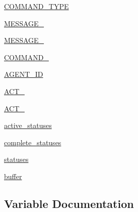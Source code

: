 \begin{DoxyCompactItemize}
\item 
\hyperlink{namespaceparlai_1_1mturk_1_1core_1_1test_1_1test__mturk__agent_a9ad87a0ebfde514be4dfa41eea065215}{C\+O\+M\+M\+A\+N\+D\+\_\+\+T\+Y\+PE}
\item 
\hyperlink{namespaceparlai_1_1mturk_1_1core_1_1test_1_1test__mturk__agent_a28c6f5b9beeebf5e93c6d8c2efc8b655}{M\+E\+S\+S\+A\+G\+E\+\_}
\item 
\hyperlink{namespaceparlai_1_1mturk_1_1core_1_1test_1_1test__mturk__agent_a9bc001709b8dcc5353618acb81060e88}{M\+E\+S\+S\+A\+G\+E\+\_}
\item 
\hyperlink{namespaceparlai_1_1mturk_1_1core_1_1test_1_1test__mturk__agent_a01581de6dfd0079d3eb0b289b5af8d5d}{C\+O\+M\+M\+A\+N\+D\+\_}
\item 
\hyperlink{namespaceparlai_1_1mturk_1_1core_1_1test_1_1test__mturk__agent_adc59afb387f75d08a9d881fb8b0df61e}{A\+G\+E\+N\+T\+\_\+\+ID}
\item 
\hyperlink{namespaceparlai_1_1mturk_1_1core_1_1test_1_1test__mturk__agent_acd7c94ef485daf4ecddeb31f720d2b65}{A\+C\+T\+\_}
\item 
\hyperlink{namespaceparlai_1_1mturk_1_1core_1_1test_1_1test__mturk__agent_ac70c2107d951e99a41210603605a92ad}{A\+C\+T\+\_}
\item 
\hyperlink{namespaceparlai_1_1mturk_1_1core_1_1test_1_1test__mturk__agent_a27ce76fc4902e6c1f52f9e5a1f0ff2f3}{active\+\_\+statuses}
\item 
\hyperlink{namespaceparlai_1_1mturk_1_1core_1_1test_1_1test__mturk__agent_a674b10e630d936de6178624a1700863e}{complete\+\_\+statuses}
\item 
\hyperlink{namespaceparlai_1_1mturk_1_1core_1_1test_1_1test__mturk__agent_a79cd521396350e888e9d34b4204d621b}{statuses}
\item 
\hyperlink{namespaceparlai_1_1mturk_1_1core_1_1test_1_1test__mturk__agent_ab6a0856c3ddfde31dd9883b16b1df25f}{buffer}
\end{DoxyCompactItemize}


\subsection{Variable Documentation}
\mbox{\label{namespaceparlai_1_1mturk_1_1core_1_1test_1_1test__mturk__agent_acd7c94ef485daf4ecddeb31f720d2b65}} 
